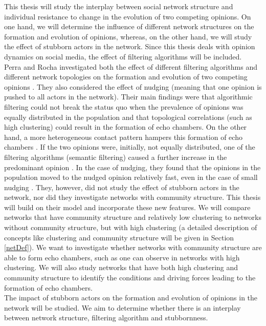 \documentclass[11 pt , letterpaper , twoside , openright]{book}
\begin{document}
This thesis will study the interplay between social network structure and individual resistance to change in the evolution of two competing opinions. On one hand, we will determine the influence of different network structures on the formation and evolution of opinions, whereas, on the other hand, we will study the effect of stubborn actors in the network. Since this thesis deals with opinion dynamics on social media, the effect of filtering algorithms will be included.\\ 
\newline
Perra and Rocha investigated both the effect of different filtering algorithms and different network topologies on the formation and evolution of two competing opinions \cite{Perra2019}. They also considered the effect of nudging (meaning that one opinion is pushed to all actors in the network). Their main findings were that algorithmic filtering could not break the status quo when the prevalence of opinions was equally distributed in the population and that topological correlations (such as high clustering) could result in the formation of echo chambers. On the other hand, a more heterogeneous contact pattern hampers this formation of echo chambers \cite{Perra2019}. If the two opinions were, initially, not equally distributed, one of the filtering algorithms (semantic filtering) caused a further increase in the predominant opinion \cite{Perra2019}. In the case of nudging, they found that the opinions in the population moved to the nudged opinion relatively fast, even in the case of small nudging \cite{Perra2019}. They, however, did not study the effect of stubborn actors in the network, nor did they investigate networks with community structure. This thesis will build on their model and incorporate these new features. We will compare networks that have community structure and relatively low clustering to networks without community structure, but with high clustering (a detailed description of concepts like clustering and community structure will be given in Section \ref{netDef}). We want to investigate whether networks with community structure are able to form echo chambers, such as one can observe in networks with high clustering. We will also study networks that have both high clustering and community structure to identify the conditions and driving forces leading to the formation of echo chambers.\\
\newline
The impact of stubborn actors on the formation and evolution of opinions in the network will be studied. We aim to determine whether there is an interplay between network structure, filtering algorithm and stubbornness.
\end{document}
